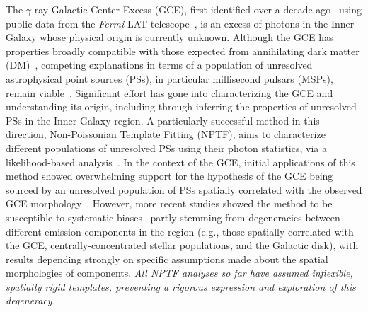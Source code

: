 \documentclass{article}
\theoremstyle{plain}
\theoremstyle{definition}
\theoremstyle{remark}
\newcommand{\Fermi} {\emph{Fermi}\xspace}
\begin{document}
The $\gamma$-ray Galactic Center Excess (GCE), first identified over a decade ago~\cite{Goodenough:2009gk} using public data from the \Fermi-LAT telescope~\cite{Atwood:2009ez}, is an excess of photons in the Inner Galaxy whose physical origin is currently unknown. Although the GCE has properties broadly compatible with those expected from annihilating dark matter (DM)~\cite{Goodenough:2009gk,Hooper:2010mq,Daylan:2014rsa,Calore:2014xka,Fermi-LAT:2015sau}, competing explanations in terms of a population of unresolved astrophysical point sources (PSs), in particular millisecond pulsars (MSPs), remain viable~\cite{Abazajian:2014fta,Abazajian:2010zy}. Significant effort has gone into characterizing the GCE and understanding its origin, including through inferring the properties of unresolved PSs in the Inner Galaxy region. A particularly successful method in this direction, Non-Poissonian Template Fitting (NPTF), aims to characterize different populations of unresolved PSs using their photon statistics, via a likelihood-based analysis~\cite{Lee:2014mza,Lee:2015fea}. In the context of the GCE, initial applications of this method showed overwhelming support for the hypothesis of the GCE being sourced by an unresolved population of PSs spatially correlated with the observed GCE morphology~\cite{Lee:2015fea}. However, more recent studies showed the method to be susceptible to systematic biases~\cite{Leane:2019xiy,Leane:2020nmi,Leane:2020pfc,Chang:2019ars} partly stemming from degeneracies between different emission components in the region (e.g., those spatially correlated with the GCE, centrally-concentrated stellar populations, and the Galactic disk), with results depending strongly on specific assumptions made about the spatial morphologies of components. \emph{All NPTF analyses so far have assumed inflexible, spatially rigid templates, preventing a rigorous expression and exploration of this degeneracy.}
\vspace{0.05in}
\end{document}
